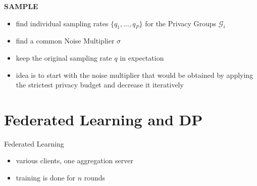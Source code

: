 \documentclass[aspectratio=169]{beamer}
\begin{document}
\begin{frame}{\textbf{SAMPLE}}
    \begin{itemize}
        \item find individual sampling rates $\{q_1, ..., q_P\}$ for the Privacy Groups $\mathcal{G}_i$
        \item find a common Noise Multiplier $\sigma$
        \item keep the original sampling rate $q$ in expectation
        \item idea is to start with the noise multiplier that would be obtained by applying the strictest privacy budget and decrease it iteratively
    \end{itemize}
\end{frame}

\section{Federated Learning and DP}

\begin{frame}{Federated Learning}
    \begin{itemize}
        \item various clients, one aggregation server
        \item training is done for $n$ rounds
    \end{itemize}
\end{frame}
\end{document}
